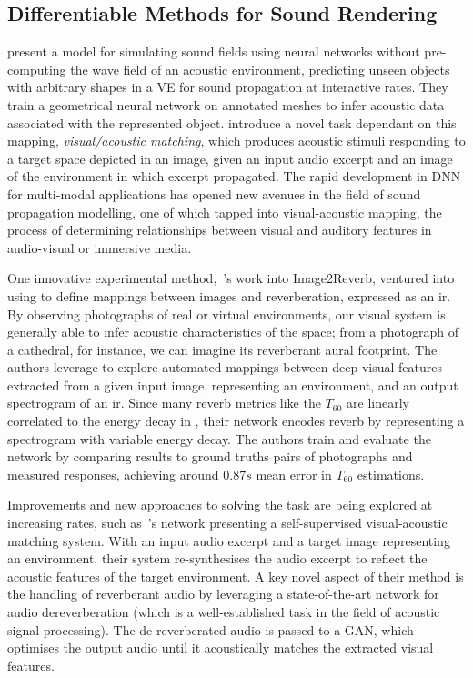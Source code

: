 \subsection{Differentiable Methods for Sound Rendering}
\cite{manocha2020differentiable} present a model for simulating sound fields using neural networks without pre-computing the wave field of an acoustic environment, predicting unseen objects with arbitrary shapes in a VE for sound propagation at interactive rates. They train a geometrical neural network on annotated meshes to infer acoustic data associated with the represented object.
\cite{chen2022visual} introduce a novel task dependant on this mapping, \textit{visual/acoustic matching}, which produces acoustic stimuli responding to a target space depicted in an image, given an input audio excerpt and an image of the environment in which excerpt propagated. The rapid development in DNN for multi-modal applications has opened new avenues in the field of sound propagation modelling, one of which tapped into visual-acoustic mapping, the process of determining relationships between visual and auditory features in audio-visual or immersive media.\par
One innovative experimental method,~\cite{Singh_2021_ICCV}'s work into Image2Reverb, ventured into using  to define mappings between images and reverberation, expressed as an \acrshort{ir}. By observing photographs of real or virtual environments, our visual system is generally able to infer acoustic characteristics of the space; from a photograph of a cathedral, for instance, we can imagine its reverberant aural footprint. The authors leverage  to explore automated mappings between deep visual features extracted from a given input image, representing an environment, and an output spectrogram of an \acrshort{ir}. Since many reverb metrics like the $T_{60}$ are linearly correlated to the energy decay in , their network encodes reverb by representing a spectrogram with variable energy decay. The authors train and evaluate the network by comparing results to ground truths pairs of photographs and measured responses, achieving around $0.87s$ mean error in $T_{60}$ estimations.\par
Improvements and new approaches to solving the task are being explored at increasing rates, such as~\cite{somayazulu2023self}'s network presenting a self-supervised visual-acoustic matching system. With an input audio excerpt and a target image representing an environment, their system re-synthesises the audio excerpt to reflect the acoustic features of the target environment. A key novel aspect of their method is the handling of reverberant audio by leveraging a state-of-the-art network for audio dereverberation (which is a well-established task in the field of acoustic signal processing). The de-reverberated audio is passed to a GAN, which optimises the output audio until it acoustically matches the extracted visual features.\par

